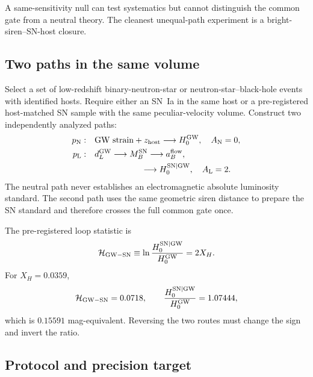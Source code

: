 \documentclass[aps,prd,twocolumn,10pt,superscriptaddress,nofootinbib]{revtex4-2}
\begin{document}
A same-sensitivity null can test systematics but cannot distinguish the
common gate from a neutral theory.  The cleanest unequal-path experiment is
a bright-siren--SN-host closure.

\subsection{Two paths in the same volume}

Select a set of low-redshift binary-neutron-star or neutron-star--black-hole
events with identified hosts.  Require either an SN~Ia in the same host or a
pre-registered host-matched SN sample with the same peculiar-velocity
volume.  Construct two independently analyzed paths:
\begin{align}
 p_{\rm N}:&\quad
 \text{GW strain}+z_{\rm host}
 \longrightarrow H_0^{\rm GW},
 \quad A_{\rm N}=0,
 \label{eq:pb_closure_neutral_path}\\
 p_{\rm L}:&\quad
 d_L^{\rm GW}\longrightarrow M_B^{\rm SN}
 \longrightarrow a_B^{\rm flow},\notag\\
 &\hspace{2.3cm}\longrightarrow H_0^{\rm SN|GW},
 \quad A_{\rm L}=2.
 \label{eq:pb_closure_ladder_path}
\end{align}
The neutral path never establishes an electromagnetic absolute luminosity
standard.  The second path uses the same geometric siren distance to prepare
the SN standard and therefore crosses the full common gate once.

The pre-registered loop statistic is
\begin{equation}
 \mathcal H_{\rm GW-SN}
 \equiv\ln\frac{H_0^{\rm SN|GW}}{H_0^{\rm GW}}
 =2X_H.
 \label{eq:pb_gw_sn_holonomy}
\end{equation}
For $X_H=0.0359$,
\begin{equation}
 \mathcal H_{\rm GW-SN}=0.0718,
 \qquad
 \frac{H_0^{\rm SN|GW}}{H_0^{\rm GW}}=1.07444,
 \label{eq:pb_gw_sn_numeric}
\end{equation}
which is $0.15591$ mag-equivalent.  Reversing the two routes must change the
sign and invert the ratio.

\subsection{Protocol and precision target}
\end{document}
